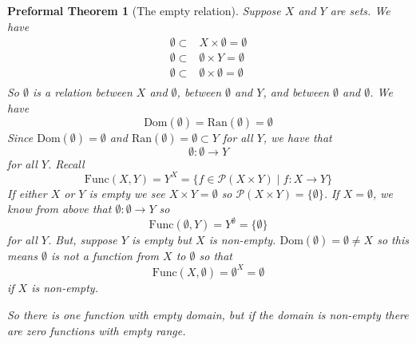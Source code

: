 \documentclass[oneside, 12pt]{book}
\theoremstyle{break}
\newtheorem{preformal definition}[definition]{Preformal Definition}
\newtheorem{preformal theorem}[theorem]{Preformal Theorem}
\newcommand{\mc}[1]{\mathcal{#1}}
\begin{document}
				\begin{preformal theorem}[The empty relation]
					\label{thm:empty relation}
					Suppose $X$ and $Y$ are sets.
					We have
					\begin{align*}
						\emptyset \subset& X \times \emptyset = \emptyset\\
						\emptyset \subset& \emptyset \times Y = \emptyset\\
						\emptyset \subset& \emptyset \times \emptyset = \emptyset\\										
					\end{align*}
					So $\emptyset$ is a relation between $X$ and $\emptyset$, between $\emptyset$ and $Y$, and between $\emptyset$ and $\emptyset$.
					We have
					\begin{equation*}
						\text{Dom}(\emptyset) = \text{Ran}(\emptyset) = \emptyset
					\end{equation*}
					Since $\text{Dom}(\emptyset) = \emptyset$ and $\text{Ran}(\emptyset) = \emptyset \subset Y$ for all $Y$, we have that
					\begin{equation*}
						\emptyset: \emptyset \to Y
					\end{equation*}
					for all $Y$.
					Recall
					\begin{equation*}
						\text{Func}(X, Y) = Y^X = \{f \in \mc{P}(X \times Y) \mid f: X \to Y\}
					\end{equation*}
					If either $X$ or $Y$ is empty we see $X\times Y = \emptyset$ so $\mc{P}(X\times Y) = \{\emptyset\}$.
					If $X = \emptyset$, we know from above that $\emptyset: \emptyset \to Y$ so 
					\begin{equation*}
						\text{Func}(\emptyset, Y) = Y^{\emptyset} = \{\emptyset\}
					\end{equation*}
					for all $Y$.
					But, suppose $Y$ is empty but $X$ is non-empty.
					$\text{Dom}(\emptyset) = \emptyset \not = X$ so this means $\emptyset$ is not a function from $X$ to $\emptyset$ so that
					\begin{equation*}
						\text{Func}(X, \emptyset) = \emptyset^X = \emptyset
					\end{equation*}
					if $X$ is non-empty.
					
					So there is one function with empty domain, but if the domain is non-empty there are zero functions with empty range.
				\end{preformal theorem}
				
\end{document}
